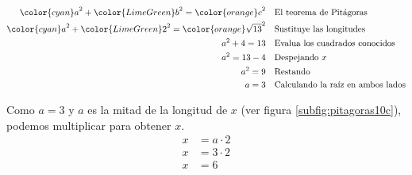 \begin{solutionbox}{7cm}
    \begin{minipage}{0.45\linewidth}
        \begin{align*}
            {\color{cyan}a}^2+{\color{LimeGreen}b}^2  ={\color{orange}c}^2         & \text{\quad El teorema de Pitágoras}           \\
            {\color{cyan}a}^2+{\color{LimeGreen}2}^2  ={\color{orange}\sqrt{13}}^2 & \text{\quad Sustituye las longitudes}          \\
            a^2+4   =13                                                            & \text{\quad Evalua los cuadrados conocidos}    \\
            a^2=13-4                                                               & \text{\quad Despejando } x                     \\
            a^2=9                                                                  & \text{\quad Restando}                          \\
            a=3                                                                    & \text{\quad Calculando la raíz en ambos lados}
        \end{align*}
    \end{minipage}%
    \begin{minipage}{0.45\linewidth}
        Como $a=3$ y $a$ es la mitad de la longitud de $x$ (ver figura \ref{subfig:pitagoras10c}), podemos multiplicar para obtener $x$.
        \begin{align*}
            x & = a\cdot 2 \\
            x & = 3\cdot 2 \\
            x & = 6
        \end{align*}
    \end{minipage}
\end{solutionbox}
